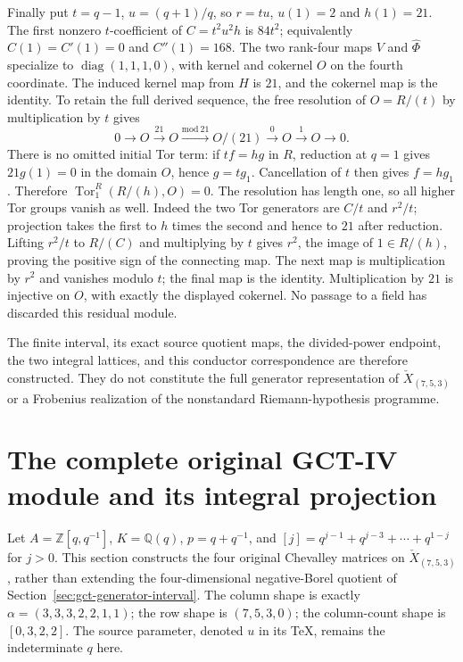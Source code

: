 Finally put $t=q-1$, $u=(q+1)/q$, so $r=tu$, $u(1)=2$ and $h(1)=21$.
The first nonzero $t$-coefficient of $C=t^2u^2h$ is $84t^2$;
equivalently $C(1)=C'(1)=0$ and $C''(1)=168$. The two rank-four
maps $V$ and $\widehat\Phi$ specialize to
$\operatorname{diag}(1,1,1,0)$, with kernel and cokernel $O$ on
the fourth coordinate. The induced kernel map from $H$ is $21$,
and the cokernel map is the identity. To retain the full derived
sequence, the free resolution of $O=R/(t)$ by multiplication by $t$
gives
\[
 0\longrightarrow O\xrightarrow{21}O
 \xrightarrow{\mathrm{mod}\ 21}O/(21)
 \xrightarrow{0}O\xrightarrow{1}O\longrightarrow0.
\]
There is no omitted initial Tor term: if $tf=hg$ in $R$, reduction
at $q=1$ gives $21g(1)=0$ in the domain $O$, hence $g=tg_1$.
Cancellation of $t$ then gives $f=hg_1$. Therefore
$\operatorname{Tor}_1^R(R/(h),O)=0$. The resolution has length one,
so all higher Tor groups vanish as well.
Indeed the two Tor generators are $C/t$ and $r^2/t$; projection takes
the first to $h$ times the second and hence to $21$ after reduction.
Lifting $r^2/t$ to $R/(C)$ and multiplying by $t$ gives $r^2$, the
image of $1\in R/(h)$, proving the positive sign of the connecting
map. The next map is multiplication by $r^2$ and vanishes modulo
$t$; the final map is the identity. Multiplication by $21$ is injective
on $O$, with exactly the displayed cokernel. No passage to a field
has discarded this residual module.

The finite interval, its exact source quotient maps, the divided-power
endpoint, the two integral lattices, and this conductor correspondence
are therefore constructed. They do not constitute the full generator
representation of $\check X_{(7,5,3)}$ or a Frobenius realization of
the nonstandard Riemann-hypothesis programme.

\section{The complete original GCT-IV module and its integral projection}
\label{sec:full-source-generators}

Let $A=\mathbb Z[q,q^{-1}]$, $K=\mathbb Q(q)$, $p=q+q^{-1}$,
and $[j]=q^{j-1}+q^{j-3}+\cdots+q^{1-j}$ for $j>0$.
This section constructs the four original Chevalley matrices on
$\check X_{(7,5,3)}$, rather than extending the four-dimensional
negative-Borel quotient of Section~\ref{sec:gct-generator-interval}.
The column shape is exactly $\alpha=(3,3,3,2,2,1,1)$; the row
shape is $(7,5,3,0)$; the column-count shape is $[0,3,2,2]$.
The source parameter, denoted $u$ in its TeX, remains the
indeterminate $q$ here.

